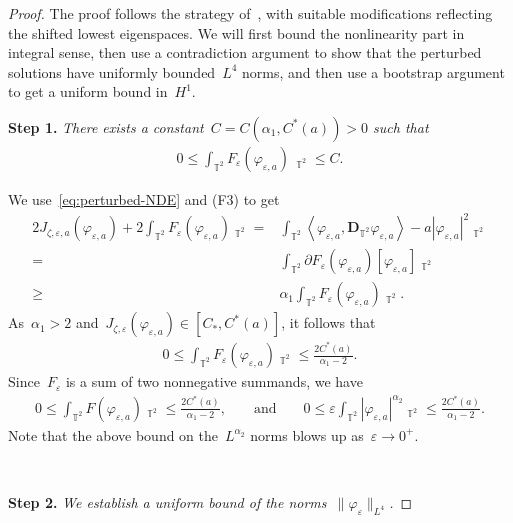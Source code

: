 \documentclass[11pt,final]{amsart}
\newcommand{\T}{\mathbb{T}}
\newcommand{\dd}{\mathop{}\!\mathrm{d}}
\newcommand{\eps}{\varepsilon}
\newcommand{\pD}{\mathbf{D}}
\newcommand{\Abracket}[1]{\left<#1\right>} %
\DeclareMathOperator{\dv}{\dd{vol}}
\begin{document}
\begin{proof}
    The proof follows the strategy of~\cite{WZ2026Stationary}, with suitable modifications reflecting the shifted lowest eigenspaces. 
    We will first bound the nonlinearity part in integral sense, then use a contradiction argument to show that the perturbed solutions have uniformly bounded~$L^4$ norms, and then use a bootstrap argument to get a uniform bound in~$H^1$. 

    \noindent\textbf{Step 1.} \emph{There exists a constant~$C=C(\alpha_1, C^*(a))>0$ such that
    \begin{align}
        0\leq \int_{\T^2} F_\eps(\varphi_{\eps,a})\, \dv_{\T^2}\leq C.
    \end{align}
    }


    We use~\eqref{eq:perturbed-NDE} and (F3) to get
    \begin{align}
        2J_{\zeta,\eps,a}(\varphi_{\eps,a}) + 2\int_{\T^2} F_\eps(\varphi_{\eps,a})\dv_{\T^2}
        =&\int_{\T^2} \Abracket{\varphi_{\eps,a},\pD_{\T^2}\varphi_{\eps,a}}-a|\varphi_{\eps,a}|^2\dv_{\T^2} \\
        =&\int_{\T^2} \partial F_\eps(\varphi_{\eps,a})[\varphi_{\eps,a}]\dv_{\T^2} \\
        \geq& \alpha_1\int_{\T^2} F_\eps(\varphi_{\eps,a}) \dv_{\T^2}.
    \end{align}
    As~$\alpha_1>2$ and~$J_{\zeta,\eps}(\varphi_{\eps,a})\in [C_*, C^*(a)]$, it follows that
    \begin{align}
        0\leq \int_{\T^2} F_\eps(\varphi_{\eps,a})\dv_{\T^2} \leq \frac{2C^*(a)}{\alpha_1-2}.
    \end{align}
    Since~$F_\eps$ is a sum of two nonnegative summands, we have 
    \begin{align}\label{eq:uniform estimate for perturbation}
    0\leq \int_{\T^2} F(\varphi_{\eps,a})\dv_{\T^2}\leq \frac{2C^*(a)}{\alpha_1-2}, & & 
    \mbox{ and } & & 
    0\leq \eps\int_{\T^2} |\varphi_{\eps,a}|^{\alpha_2}\dv_{\T^2}\leq \frac{2C^*(a)}{\alpha_1-2}.
    \end{align}
    Note that the above bound on the~$L^{\alpha_2}$ norms blows up as~$\eps\to0^+$.

    \


\noindent\textbf{Step 2.} \emph{We establish a uniform bound of the norms~$\|\varphi_\eps\|_{L^4}$.} 


\end{proof}
\end{document}
